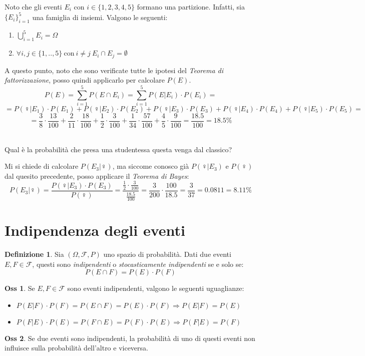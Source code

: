 \documentclass[12pt, a4paper]{report}
\theoremstyle{definition}
\newtheorem{definition}{Definizione}[section]
\newtheorem*{observation}{Oss}
\DeclareRobustCommand{\F}{\mathcal{F}}%
\DeclareRobustCommand{\probspace}{(\Omega,\F,P)}
\begin{document}
Noto che gli eventi $E_i$ con $i\in\{1,2,3,4,5\}$ formano una partizione.
Infatti, sia \(\{E_i\}_{i=1}^5\) una famiglia di insiemi. Valgono le seguenti:
\begin{enumerate}[label=(\roman*)]
	\item \(\bigcup_{i=1}^5 E_i=\Omega\)
	\item \(\forall i,j\in\{1,..,5\}\ \text{con}\ i\neq j\ E_i\cap E_j=\emptyset\)
\end{enumerate}

A questo punto, noto che sono verificate tutte le ipotesi del
\emph{Teorema di fattorizzazione}, posso quindi applicarlo per calcolare $P(E)$.
\[P(E)=\sum_{i=1}^5 P(E\cap E_i)=\sum_{i=1}^5P(E|E_i)\cdot P(E_i)=\]
\[=P(\female|E_1)\cdot P(E_1)+P(\female|E_2)\cdot P(E_2)+P(\female|E_3)\cdot P(E_3)+
P(\female|E_4)\cdot P(E_4)+P(\female|E_5)\cdot P(E_5)=\]
\[=\frac{3}{8}\cdot \frac{13}{100}+\frac{2}{11}\cdot \frac{18}{100}+\frac{1}{2}\cdot \frac{3}{100}
+\frac{1}{34}\cdot \frac{57}{100}+\frac{4}{5}\cdot \frac{9}{100}=\frac{18.5}{100}=18.5\%\]

\noindent
\\Qual è la probabilità che presa una studentessa questa venga dal classico?

Mi si chiede di calcolare \(P(E_3|\female)\), ma siccome conosco già 
\(P(\female|E_3)\) e \(P(\female)\) dal quesito precedente, posso applicare il
\emph{Teorema di Bayes}:
\[P(E_3|\female)=\frac{P(\female|E_3)\cdot P(E_3)}{P(\female)}=\frac{\frac{1}{2}\cdot 
\frac{3}{100}}{\frac{18.5}{100}}=\frac{3}{200}\cdot \frac{100}{18.5}=\frac{3}{37}=
0.0811=8.11\%\]

\section{Indipendenza degli eventi}
\begin{definition}
	Sia $\probspace$ uno spazio di probabilità. Dati due eventi \(E,F\in\F\),
	questi sono \emph{indipendenti} o \emph{stocasticamente indipendenti} se e
	solo se:
	\[P(E\cap F)=P(E)\cdot P(F)\]
\end{definition}
\begin{observation}
	Se \(E,F\in\F\) sono eventi indipendenti, valgono le seguenti uguaglianze:
	\begin{itemize}
		\item \(P(E|F)\cdot P(F)=P(E\cap F)=P(E)\cdot P(F)\Rightarrow P(E|F)=P(E)\)
		\item \(P(F|E)\cdot P(E)=P(F\cap E)=P(F)\cdot P(E)\Rightarrow P(F|E)=P(F)\)
	\end{itemize}
\end{observation}
\begin{observation}
	Se due eventi sono indipendenti, la probabilità di uno di questi eventi non
	influisce sulla probabilità dell'altro e viceversa.
\end{observation}
\end{document}

